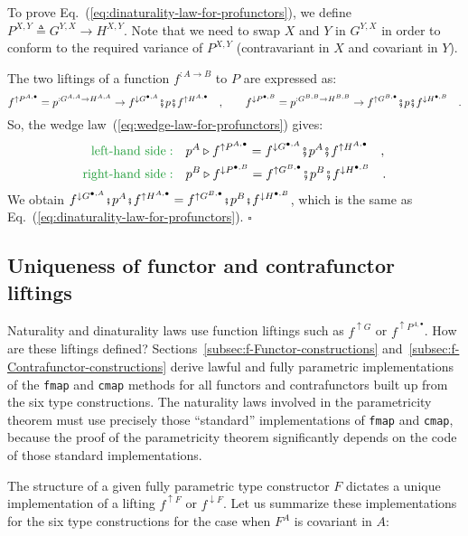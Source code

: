 To prove Eq.~(\ref{eq:dinaturality-law-for-profunctors}), we define
$P^{X,Y}\triangleq G^{Y,X}\rightarrow H^{X,Y}$. Note that we need
to swap $X$ and $Y$ in $G^{Y,X}$ in order to conform to the required
variance of $P^{X,Y}$ (contravariant in $X$ and covariant in $Y$). 

The two liftings of a function $f^{:A\rightarrow B}$ to $P$ are
expressed as:
\[
f^{\uparrow P^{A,\bullet}}=p^{:G^{A,A}\rightarrow H^{A,A}}\rightarrow f^{\downarrow G^{\bullet,A}}\bef p\bef f^{\uparrow H^{A,\bullet}}\quad,\quad\quad f^{\downarrow P^{\bullet,B}}=p^{:G^{B,B}\rightarrow H^{B,B}}\rightarrow f^{\uparrow G^{B,\bullet}}\bef p\bef f^{\downarrow H^{\bullet,B}}\quad.
\]
So, the wedge law~(\ref{eq:wedge-law-for-profunctors}) gives:
\begin{align*}
{\color{greenunder}\text{left-hand side}:}\quad & p^{A}\triangleright f^{\uparrow P^{A,\bullet}}=f^{\downarrow G^{\bullet,A}}\bef p^{A}\bef f^{\uparrow H^{A,\bullet}}\quad,\\
{\color{greenunder}\text{right-hand side}:}\quad & p^{B}\triangleright f^{\downarrow P^{\bullet,B}}=f^{\uparrow G^{B,\bullet}}\bef p^{B}\bef f^{\downarrow H^{\bullet,B}}\quad.
\end{align*}
We obtain $f^{\downarrow G^{\bullet,A}}\bef p^{A}\bef f^{\uparrow H^{A,\bullet}}=f^{\uparrow G^{B,\bullet}}\bef p^{B}\bef f^{\downarrow H^{\bullet,B}}$,
which is the same as Eq.~(\ref{eq:dinaturality-law-for-profunctors}).
$\square$

\subsection{Uniqueness of functor and contrafunctor liftings\label{sec:Uniqueness-of-functor-and-contrafunctor}}

Naturality and dinaturality laws use function liftings such as $f^{\uparrow G}$
or $f^{\uparrow P^{A,\bullet}}$. How are these liftings defined?
Sections~\ref{subsec:f-Functor-constructions} and~\ref{subsec:f-Contrafunctor-constructions}
derive lawful and fully parametric implementations of the \lstinline!fmap!
and \lstinline!cmap! methods for all functors and contrafunctors
built up from the six type constructions. The naturality laws involved
in the parametricity theorem must use precisely those \textsf{``}standard\textsf{''}
implementations of \lstinline!fmap! and \lstinline!cmap!, because
the proof of the parametricity theorem significantly depends on the
code of those standard implementations.

The structure of a given fully parametric type constructor $F$ dictates
a unique implementation of a lifting $f^{\uparrow F}$ or $f^{\downarrow F}$.
Let us summarize these implementations for the six type constructions
for the case when $F^{A}$ is covariant in $A$:

